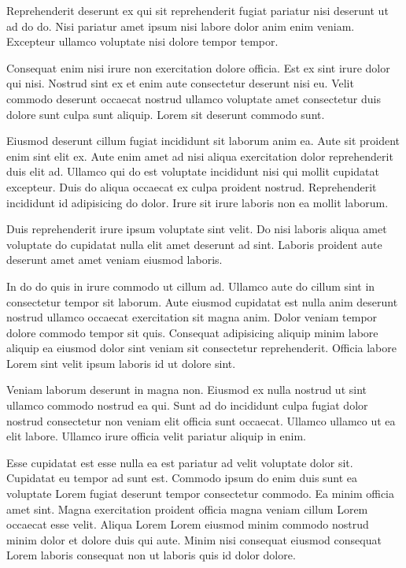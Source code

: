 Reprehenderit deserunt ex qui sit reprehenderit fugiat pariatur nisi deserunt ut ad do do. Nisi pariatur amet ipsum nisi labore dolor anim enim veniam. Excepteur ullamco voluptate nisi dolore tempor tempor.

Consequat enim nisi irure non exercitation dolore officia. Est ex sint irure dolor qui nisi. Nostrud sint ex et enim aute consectetur deserunt nisi eu. Velit commodo deserunt occaecat nostrud ullamco voluptate amet consectetur duis dolore sunt culpa sunt aliquip. Lorem sit deserunt commodo sunt.

Eiusmod deserunt cillum fugiat incididunt sit laborum anim ea. Aute sit proident enim sint elit ex. Aute enim amet ad nisi aliqua exercitation dolor reprehenderit duis elit ad. Ullamco qui do est voluptate incididunt nisi qui mollit cupidatat excepteur. Duis do aliqua occaecat ex culpa proident nostrud. Reprehenderit incididunt id adipisicing do dolor. Irure sit irure laboris non ea mollit laborum.

Duis reprehenderit irure ipsum voluptate sint velit. Do nisi laboris aliqua amet voluptate do cupidatat nulla elit amet deserunt ad sint. Laboris proident aute deserunt amet amet veniam eiusmod laboris.

In do do quis in irure commodo ut cillum ad. Ullamco aute do cillum sint in consectetur tempor sit laborum. Aute eiusmod cupidatat est nulla anim deserunt nostrud ullamco occaecat exercitation sit magna anim. Dolor veniam tempor dolore commodo tempor sit quis. Consequat adipisicing aliquip minim labore aliquip ea eiusmod dolor sint veniam sit consectetur reprehenderit. Officia labore Lorem sint velit ipsum laboris id ut dolore sint.

Veniam laborum deserunt in magna non. Eiusmod ex nulla nostrud ut sint ullamco commodo nostrud ea qui. Sunt ad do incididunt culpa fugiat dolor nostrud consectetur non veniam elit officia sunt occaecat. Ullamco ullamco ut ea elit labore. Ullamco irure officia velit pariatur aliquip in enim.

Esse cupidatat est esse nulla ea est pariatur ad velit voluptate dolor sit. Cupidatat eu tempor ad sunt est. Commodo ipsum do enim duis sunt ea voluptate Lorem fugiat deserunt tempor consectetur commodo. Ea minim officia amet sint. Magna exercitation proident officia magna veniam cillum Lorem occaecat esse velit. Aliqua Lorem Lorem eiusmod minim commodo nostrud minim dolor et dolore duis qui aute. Minim nisi consequat eiusmod consequat Lorem laboris consequat non ut laboris quis id dolor dolore.

